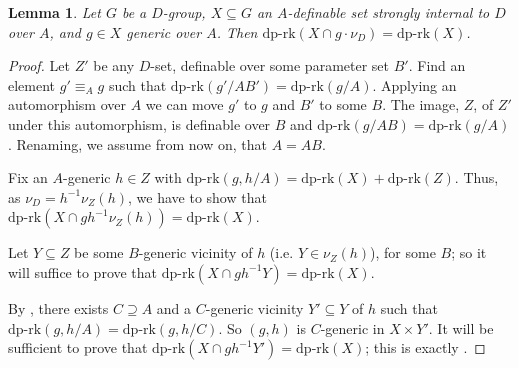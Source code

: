 \documentclass[11pt]{amsart}
\newtheorem{lemma}[theorem]{Lemma}
\theoremstyle{definition}
\newcommand{\0}{\emptyset}
\def\dpr{\mathrm{dp\text{-}rk}}
\begin{document}
\begin{lemma}\label{L:intersects largely} 
Let $G$ be a $D$-group,  $X\subseteq G$ an $A$-definable set strongly internal to $D$ over $A$, and  $g\in X$ generic over $A$.  Then $\dpr(X\cap g\cdot \nu_D )=\dpr(X)$. 
\end{lemma}
\begin{proof}
 Let $Z'$ be any $D$-set, definable over some parameter set $B'$. Find an element $g'\equiv_A g$ such that $\dpr(g'/AB')=\dpr(g/A)$. Applying an automorphism over $A$ we can move $g'$ to $g$ and $B'$ to some $B$.  The image, $Z$, of $Z'$ under this automorphism, is  definable over $B$ and $\dpr(g/AB)=\dpr(g/A)$. Renaming, we assume from now on, that  $A=AB$.

Fix an $A$-generic $h\in Z$ with $\dpr(g,h/A)=\dpr(X)+\dpr(Z)$. Thus, as $\nu_D=h^{-1}\nu_Z(h)$, we have to show that $\dpr(X\cap gh^{-1}\nu_Z(h))=\dpr(X)$.

Let $Y\subseteq Z$ be some $B$-generic vicinity of $h$ (i.e. $Y\in \nu_Z(h)$), for some $B$; so it will suffice to prove that $\dpr(X\cap gh^{-1}Y)=\dpr(X)$.

By \cite[Lemma 4.13]{HaHaPeGps}, there exists $C\supseteq A$ and a $C$-generic vicinity $Y'\subseteq Y$ of $h$ such that $\dpr(g,h/A)=\dpr(g,h/C)$. So $(g,h)$ is $C$-generic in $X\times Y'$. It will be sufficient to prove that $\dpr(X\cap gh^{-1}Y')=\dpr(X)$; this is exactly \cite[Lemma 4.26]{HaHaPeGps}.
 \end{proof}
\end{document}
